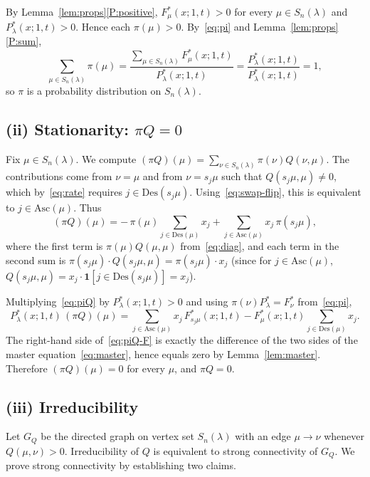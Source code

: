 \documentclass[12pt]{article}
\theoremstyle{definition}
\begin{document}
By Lemma~\ref{lem:props}\ref{P:positive}, $F^*_\mu(x;1,t)>0$ for every
$\mu\in S_n(\lambda)$ and $P^*_\lambda(x;1,t)>0$. Hence each
$\pi(\mu)>0$. By~\eqref{eq:pi} and Lemma~\ref{lem:props}\ref{P:sum},
\[
\sum_{\mu\in S_n(\lambda)}\pi(\mu)
=\frac{\sum_{\mu\in S_n(\lambda)}F^*_\mu(x;1,t)}{P^*_\lambda(x;1,t)}
=\frac{P^*_\lambda(x;1,t)}{P^*_\lambda(x;1,t)}=1,
\]
so $\pi$ is a probability distribution on $S_n(\lambda)$.

\subsection{(ii) Stationarity: $\pi Q=0$}

Fix $\mu\in S_n(\lambda)$. We compute $(\pi Q)(\mu)
=\sum_{\nu\in S_n(\lambda)}\pi(\nu)Q(\nu,\mu)$. The contributions come
from $\nu=\mu$ and from $\nu=s_j\mu$ such that
$Q(s_j\mu,\mu)\neq 0$, which by~\eqref{eq:rate} requires
$j\in\mathrm{Des}(s_j\mu)$. Using~\eqref{eq:swap-flip}, this is
equivalent to $j\in\mathrm{Asc}(\mu)$. Thus
\begin{equation}\label{eq:piQ}
(\pi Q)(\mu)
=-\,\pi(\mu)\!\!\sum_{j\in\mathrm{Des}(\mu)}\!\!x_j
+\sum_{j\in\mathrm{Asc}(\mu)}\!x_j\,\pi(s_j\mu),
\end{equation}
where the first term is $\pi(\mu)Q(\mu,\mu)$ from~\eqref{eq:diag}, and
each term in the second sum is $\pi(s_j\mu)\cdot Q(s_j\mu,\mu)
=\pi(s_j\mu)\cdot x_j$ (since for $j\in\mathrm{Asc}(\mu)$, $Q(s_j\mu,\mu)
=x_j\cdot\mathbf{1}[j\in\mathrm{Des}(s_j\mu)]=x_j$).

Multiplying~\eqref{eq:piQ} by $P^*_\lambda(x;1,t)>0$ and using
$\pi(\nu)P^*_\lambda=F^*_\nu$ from~\eqref{eq:pi},
\begin{equation}\label{eq:piQ-F}
P^*_\lambda(x;1,t)\,(\pi Q)(\mu)
=\sum_{j\in\mathrm{Asc}(\mu)}\!x_j\,F^*_{s_j\mu}(x;1,t)
-F^*_\mu(x;1,t)\!\!\sum_{j\in\mathrm{Des}(\mu)}\!\!x_j.
\end{equation}
The right-hand side of~\eqref{eq:piQ-F} is exactly the difference of
the two sides of the master equation~\eqref{eq:master}, hence equals
zero by Lemma~\ref{lem:master}. Therefore $(\pi Q)(\mu)=0$ for every
$\mu$, and $\pi Q=0$.

\subsection{(iii) Irreducibility}\label{sec:irred}

Let $G_Q$ be the directed graph on vertex set $S_n(\lambda)$ with an
edge $\mu\to\nu$ whenever $Q(\mu,\nu)>0$. Irreducibility of $Q$ is
equivalent to strong connectivity of $G_Q$. We prove strong
connectivity by establishing two claims.
\end{document}
